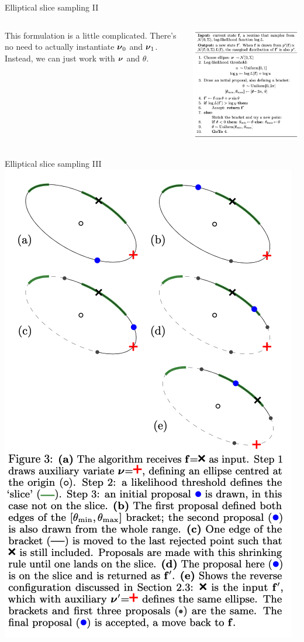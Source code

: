 \documentclass[aspectratio=169]{beamer}
\begin{document}
\begin{frame}[t]{Elliptical slice sampling II}
\begin{columns}
\begin{column}{.5\textwidth}
This formulation is a little complicated. There's no need to actually instantiate $\boldsymbol{\nu}_0$ and $\boldsymbol{\nu}_1$. Instead, we can just work with $\boldsymbol{\nu}$ and $\theta$.
\end{column}
\begin{column}{.5\textwidth}
\includegraphics[width=\textwidth]{figures/lap8/ess1.png}
\end{column}
\end{columns}
\end{frame}

\begin{frame}{Elliptical slice sampling III}
    \centering
    \includegraphics[width=.33\textwidth]{figures/lap8/ess2.png}
\end{frame}
\end{document}
